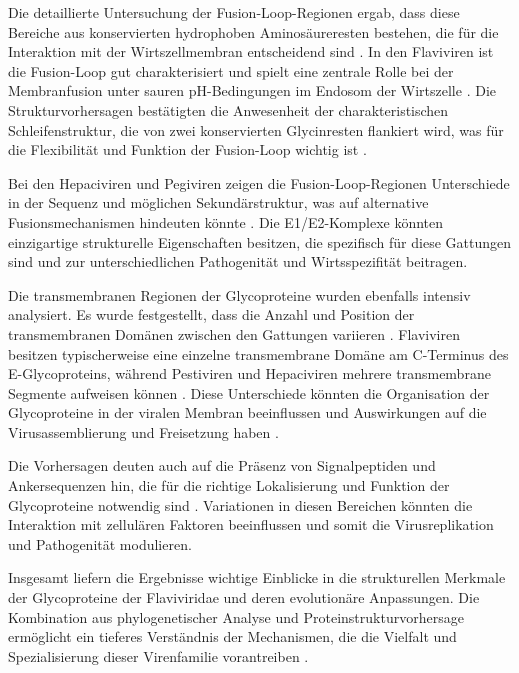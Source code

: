 Die detaillierte Untersuchung der Fusion-Loop-Regionen ergab, dass diese Bereiche aus konservierten hydrophoben Aminosäureresten bestehen, die für die Interaktion mit der Wirtszellmembran entscheidend sind \autocite{Modis2004}. In den Flaviviren ist die Fusion-Loop gut charakterisiert und spielt eine zentrale Rolle bei der Membranfusion unter sauren pH-Bedingungen im Endosom der Wirtszelle \autocite{Rey1995}. Die Strukturvorhersagen bestätigten die Anwesenheit der charakteristischen Schleifenstruktur, die von zwei konservierten Glycinresten flankiert wird, was für die Flexibilität und Funktion der Fusion-Loop wichtig ist \autocite{Modis2004}.

Bei den Hepaciviren und Pegiviren zeigen die Fusion-Loop-Regionen Unterschiede in der Sequenz und möglichen Sekundärstruktur, was auf alternative Fusionsmechanismen hindeuten könnte \autocite{Lavie2017}. Die E1/E2-Komplexe könnten einzigartige strukturelle Eigenschaften besitzen, die spezifisch für diese Gattungen sind und zur unterschiedlichen Pathogenität und Wirtsspezifität beitragen.

Die transmembranen Regionen der Glycoproteine wurden ebenfalls intensiv analysiert. Es wurde festgestellt, dass die Anzahl und Position der transmembranen Domänen zwischen den Gattungen variieren \autocite{Tautz2015}. Flaviviren besitzen typischerweise eine einzelne transmembrane Domäne am C-Terminus des E-Glycoproteins, während Pestiviren und Hepaciviren mehrere transmembrane Segmente aufweisen können \autocite{peninStructureFunctionMembrane2004}. Diese Unterschiede könnten die Organisation der Glycoproteine in der viralen Membran beeinflussen und Auswirkungen auf die Virusassemblierung und Freisetzung haben \autocite{peninStructureFunctionMembrane2004}.

Die Vorhersagen deuten auch auf die Präsenz von Signalpeptiden und Ankersequenzen hin, die für die richtige Lokalisierung und Funktion der Glycoproteine notwendig sind \autocite{Ashkenazy2016}. Variationen in diesen Bereichen könnten die Interaktion mit zellulären Faktoren beeinflussen und somit die Virusreplikation und Pathogenität modulieren.

Insgesamt liefern die Ergebnisse wichtige Einblicke in die strukturellen Merkmale der Glycoproteine der Flaviviridae und deren evolutionäre Anpassungen. Die Kombination aus phylogenetischer Analyse und Proteinstrukturvorhersage ermöglicht ein tieferes Verständnis der Mechanismen, die die Vielfalt und Spezialisierung dieser Virenfamilie vorantreiben \autocite{mifsudMappingGlycoproteinStructure2024}.

